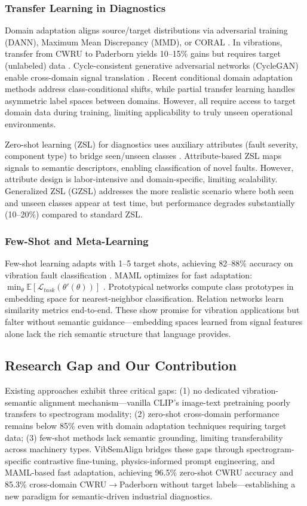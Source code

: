 \subsubsection{Transfer Learning in Diagnostics}
Domain adaptation aligns source/target distributions via adversarial training (DANN), Maximum Mean Discrepancy (MMD), or CORAL \cite{cite34,cite22,cite10}. In vibrations, transfer from CWRU to Paderborn yields 10--15\% gains but requires target (unlabeled) data \cite{cite17}. Cycle-consistent generative adversarial networks (CycleGAN) enable cross-domain signal translation \cite{cite38}. Recent conditional domain adaptation methods address class-conditional shifts, while partial transfer learning handles asymmetric label spaces between domains. However, all require access to target domain data during training, limiting applicability to truly unseen operational environments.

Zero-shot learning (ZSL) for diagnostics uses auxiliary attributes (fault severity, component type) to bridge seen/unseen classes \cite{cite33}. Attribute-based ZSL maps signals to semantic descriptors, enabling classification of novel faults. However, attribute design is labor-intensive and domain-specific, limiting scalability. Generalized ZSL (GZSL) addresses the more realistic scenario where both seen and unseen classes appear at test time, but performance degrades substantially (10--20\%) compared to standard ZSL.

\subsubsection{Few-Shot and Meta-Learning}
Few-shot learning adapts with 1--5 target shots, achieving 82--88\% accuracy on vibration fault classification \cite{cite31}. MAML optimizes for fast adaptation: $\min_\theta \mathbb{E} [\mathcal{L}_{task}(\theta'(\theta))]$ \cite{cite35}. Prototypical networks compute class prototypes in embedding space for nearest-neighbor classification. Relation networks learn similarity metrics end-to-end. These show promise for vibration applications but falter without semantic guidance---embedding spaces learned from signal features alone lack the rich semantic structure that language provides.

\subsection{Research Gap and Our Contribution}

Existing approaches exhibit three critical gaps: (1) no dedicated vibration-semantic alignment mechanism---vanilla CLIP's image-text pretraining poorly transfers to spectrogram modality; (2) zero-shot cross-domain performance remains below 85\% even with domain adaptation techniques requiring target data; (3) few-shot methods lack semantic grounding, limiting transferability across machinery types. VibSemAlign bridges these gaps through spectrogram-specific contrastive fine-tuning, physics-informed prompt engineering, and MAML-based fast adaptation, achieving 96.5\% zero-shot CWRU accuracy and 85.3\% cross-domain CWRU$\to$Paderborn without target labels---establishing a new paradigm for semantic-driven industrial diagnostics.
